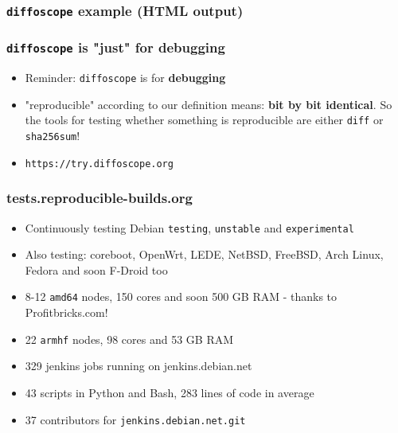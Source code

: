 \documentclass[14pt]{beamer}
\newif\ifplacelogo
\begin{document}
{\begin{frame}
 \frametitle{\texttt{diffoscope} example (HTML output)}
\end{frame}


\begin{frame}
 \frametitle{\texttt{diffoscope} is "just" for debugging}

 \begin{itemize}
  \item Reminder: \texttt{diffoscope} is for \textbf{debugging}
  \item "reproducible" according to our definition means: \textbf{bit by bit
  identical}. So the tools for testing whether something is reproducible are
  either \texttt{diff} or \texttt{sha256sum}!
  \item<2> \texttt{https://try.diffoscope.org}
 \end{itemize}
\end{frame}

}

\placelogotrue


\begin{frame}
 \frametitle{tests.reproducible-builds.org}

 \begin{itemize}
  \item Continuously testing Debian \texttt{testing}, \texttt{unstable} and
  \texttt{experimental}
  \item Also testing: coreboot, OpenWrt, LEDE, NetBSD, FreeBSD,
  Arch Linux, Fedora and soon F-Droid too
  \item 8-12 \texttt{amd64} nodes, 150 cores and soon 500 GB RAM - thanks to
  Profitbricks.com!
  \item 22 \texttt{armhf} nodes, 98 cores and 53 GB RAM
  \item 329 jenkins jobs running on jenkins.debian.net
  \item 43 scripts in Python and Bash, 283 lines of code in average
  \item 37 contributors for \texttt{jenkins.debian.net.git}
 \end{itemize}
\end{frame}
\end{document}
